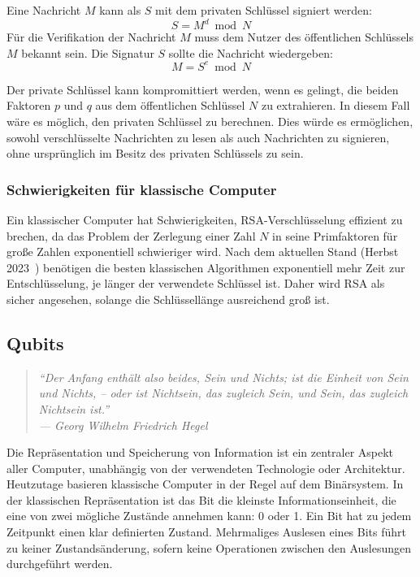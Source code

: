 Eine Nachricht \( M \) kann als \(S\) mit dem privaten Schlüssel signiert werden:
\[
  S = M^d \bmod N
\]
Für die Verifikation der Nachricht \(M\) muss dem Nutzer des öffentlichen Schlüssels \(M\) bekannt sein. 
Die Signatur \(S\) sollte die Nachricht wiedergeben:
\[
  M = S^e \bmod N
\]

Der private Schlüssel kann kompromittiert werden, wenn es gelingt, die beiden Faktoren \(p\) und 
\(q\) aus dem öffentlichen Schlüssel \(N\) zu extrahieren. 
In diesem Fall wäre es möglich, den privaten Schlüssel zu berechnen. 
Dies würde es ermöglichen, sowohl verschlüsselte Nachrichten zu lesen als auch Nachrichten zu signieren, 
ohne ursprünglich im Besitz des privaten Schlüssels zu sein.

\subsubsection*{Schwierigkeiten für klassische Computer}
Ein klassischer Computer hat Schwierigkeiten, 
RSA-Verschlüsselung effizient zu brechen, 
da das Problem der Zerlegung einer Zahl \(N\) in seine Primfaktoren für große Zahlen exponentiell schwieriger wird. 
Nach dem aktuellen Stand (Herbst 2023~\cite{Hoever2022Krypto}) benötigen die besten klassischen Algorithmen exponentiell mehr Zeit zur Entschlüsselung, 
je länger der verwendete Schlüssel ist.
Daher wird RSA als sicher angesehen, solange die Schlüssellänge ausreichend groß ist.



\subsection{Qubits} 
\begin{quote}
  \noindent
  \textit{"`Der Anfang enthält also beides, Sein und
  Nichts; ist die Einheit von Sein und Nichts,
  -- oder ist Nichtsein, das zugleich Sein, und
  Sein, das zugleich Nichtsein ist."' \\
  --- Georg Wilhelm Friedrich Hegel}
\end{quote}

Die Repräsentation und Speicherung von Information ist ein zentraler Aspekt aller Computer, 
unabhängig von der verwendeten Technologie oder Architektur.
Heutzutage basieren klassische Computer in der Regel auf dem Binärsystem. 
In der klassischen Repräsentation ist das Bit die kleinste Informationseinheit, 
die eine von zwei mögliche Zustände annehmen kann: 0 oder 1. 
Ein Bit hat zu jedem Zeitpunkt einen klar definierten Zustand. 
Mehrmaliges Auslesen eines Bits führt zu keiner Zustandsänderung, 
sofern keine Operationen zwischen den Auslesungen durchgeführt werden.

